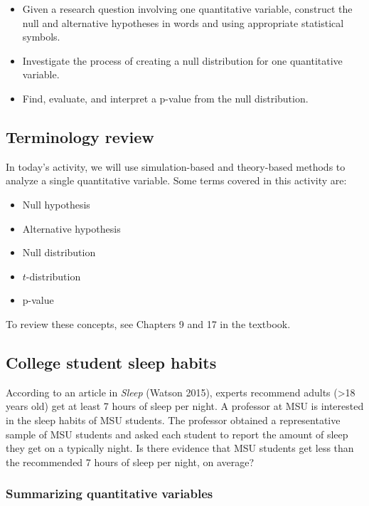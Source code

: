 \documentclass[
]{report}
\begin{document}
\begin{itemize}
\item
  Given a research question involving one quantitative variable, construct the null and alternative hypotheses
  in words and using appropriate statistical symbols.
\item
  Investigate the process of creating a null distribution for one quantitative variable.
\item
  Find, evaluate, and interpret a p-value from the null distribution.
\end{itemize}

\subsection{Terminology review}\label{terminology-review-10}

In today's activity, we will use simulation-based and theory-based methods to analyze a single quantitative variable. Some terms covered in this activity are:

\begin{itemize}
\item
  Null hypothesis
\item
  Alternative hypothesis
\item
  Null distribution
\item
  \(t\)-distribution
\item
  p-value
\end{itemize}

To review these concepts, see Chapters 9 and 17 in the textbook.

\subsection{College student sleep habits}\label{college-student-sleep-habits}

According to an article in \emph{Sleep} (Watson 2015), experts recommend adults (\textgreater18 years old) get at least 7 hours of sleep per night. A professor at MSU is interested in the sleep habits of MSU students. The professor obtained a representative sample of MSU students and asked each student to report the amount of sleep they get on a typically night. Is there evidence that MSU students get less than the recommended 7 hours of sleep per night, on average?

\subsubsection*{Summarizing quantitative variables}\label{summarizing-quantitative-variables-1}
\end{document}
